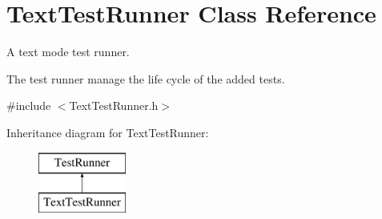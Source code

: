 \hypertarget{class_text_test_runner}{\section{Text\-Test\-Runner Class Reference}
\label{class_text_test_runner}
}


A text mode test runner.

The test runner manage the life cycle of the added tests.  




{\ttfamily \#include $<$Text\-Test\-Runner.\-h$>$}

Inheritance diagram for Text\-Test\-Runner\-:\begin{figure}[H]
\begin{center}
\leavevmode
\includegraphics[height=2.000000cm]{class_text_test_runner}
\end{center}
\end{figure}
